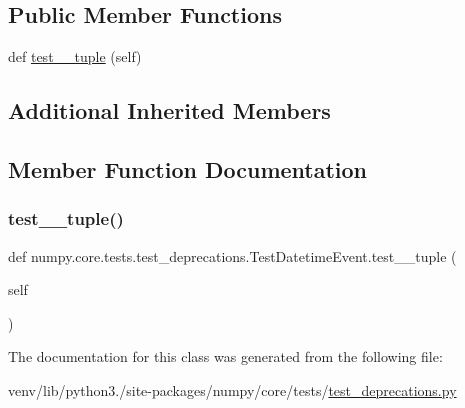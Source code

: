 \subsection*{Public Member Functions}
\begin{DoxyCompactItemize}
\item 
def \hyperlink{classnumpy_1_1core_1_1tests_1_1test__deprecations_1_1TestDatetimeEvent_a9ed16f274f38b6fa207c914a0b2c3c87}{test\+\_\+\_\+tuple} (self)
\end{DoxyCompactItemize}
\subsection*{Additional Inherited Members}


\subsection{Member Function Documentation}
\mbox{\label{classnumpy_1_1core_1_1tests_1_1test__deprecations_1_1TestDatetimeEvent_a9ed16f274f38b6fa207c914a0b2c3c87}} 
\subsubsection{\texorpdfstring{test\+\_\+\_\+tuple()}{test\_3\_tuple()}}
{\footnotesize\ttfamily def numpy.\+core.\+tests.\+test\+\_\+deprecations.\+Test\+Datetime\+Event.\+test\+\_\+\_\+tuple (\begin{DoxyParamCaption}\item[{}]{self }\end{DoxyParamCaption})}



The documentation for this class was generated from the following file\+:\begin{DoxyCompactItemize}
\item 
venv/lib/python3./site-\/packages/numpy/core/tests/\hyperlink{core_2tests_2test__deprecations_8py}{test\+\_\+deprecations.\+py}\end{DoxyCompactItemize}
